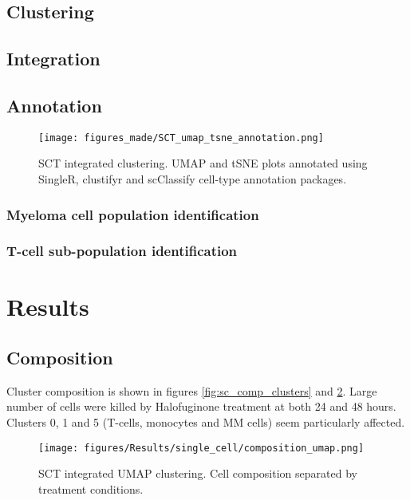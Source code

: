\subsection{Clustering}

\subsection{Integration}

\subsection{Annotation}

\begin{figure}[h]
\centering
\texttt{[image: figures\_made/SCT\_umap\_tsne\_annotation.png]}
\caption[Single-cell annotation]{SCT integrated clustering. UMAP and tSNE plots annotated using SingleR, clustifyr and scClassify cell-type annotation packages.}
\label{fig:sc_annotation}
\end{figure}

\subsubsection{Myeloma cell population identification}

\subsubsection{T-cell sub-population identification}

\section{Results}

\subsection{Composition}
Cluster composition is shown in figures \ref{fig:sc_comp_clusters} and \ref{fig:sc_umap_comp}.
Large number of cells were killed by Halofuginone treatment at both 24 and 48 hours.
Clusters 0, 1 and 5 (T-cells, monocytes and MM cells) seem particularly affected.

\begin{figure}[htb]
\centering
\texttt{[image: figures/Results/single\_cell/composition\_umap.png]}
\caption[UMAP cluster composition]{SCT integrated UMAP clustering. Cell composition separated by treatment conditions. }
\label{fig:sc_umap_comp}
\end{figure}


